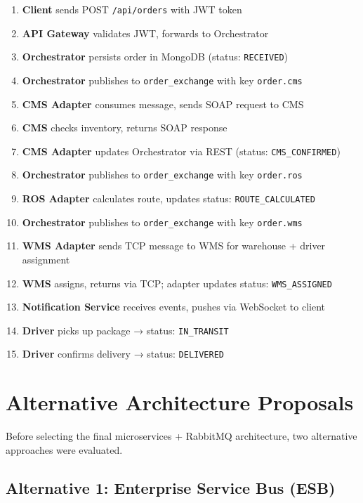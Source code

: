 \documentclass[12pt,a4paper]{article}
\begin{document}
\begin{enumerate}
  \item \textbf{Client} sends POST \texttt{/api/orders} with JWT token
  \item \textbf{API Gateway} validates JWT, forwards to Orchestrator
  \item \textbf{Orchestrator} persists order in MongoDB (status: \texttt{RECEIVED})
  \item \textbf{Orchestrator} publishes to \texttt{order\_exchange} with key \texttt{order.cms}
  \item \textbf{CMS Adapter} consumes message, sends SOAP request to CMS
  \item \textbf{CMS} checks inventory, returns SOAP response
  \item \textbf{CMS Adapter} updates Orchestrator via REST (status: \texttt{CMS\_CONFIRMED})
  \item \textbf{Orchestrator} publishes to \texttt{order\_exchange} with key \texttt{order.ros}
  \item \textbf{ROS Adapter} calculates route, updates status: \texttt{ROUTE\_CALCULATED}
  \item \textbf{Orchestrator} publishes to \texttt{order\_exchange} with key \texttt{order.wms}
  \item \textbf{WMS Adapter} sends TCP message to WMS for warehouse + driver assignment
  \item \textbf{WMS} assigns, returns via TCP; adapter updates status: \texttt{WMS\_ASSIGNED}
  \item \textbf{Notification Service} receives events, pushes via WebSocket to client
  \item \textbf{Driver} picks up package → status: \texttt{IN\_TRANSIT}
  \item \textbf{Driver} confirms delivery → status: \texttt{DELIVERED}
\end{enumerate}

\section{Alternative Architecture Proposals}

Before selecting the final microservices + RabbitMQ architecture, two alternative approaches were evaluated.

\subsection{Alternative 1: Enterprise Service Bus (ESB)}
\end{document}
